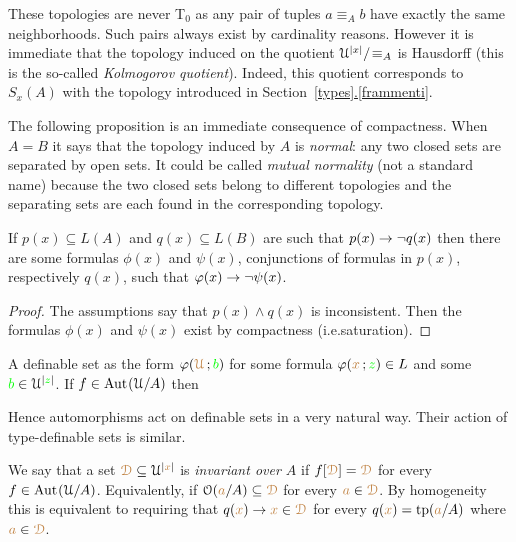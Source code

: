 \documentclass[creche.tex]{subfiles}
\begin{document}
These topologies are never T$_0$ as any pair of tuples $a\equiv_A b$ have exactly the same neighborhoods. Such pairs always exist by cardinality reasons. However it is immediate that the topology induced on the quotient $\EuScript U^{|x|}/\!\equiv_A$ is Hausdorff (this is the so-called \textit{Kolmogorov quotient}). Indeed, this quotient corresponds to $S_x(A)$ with the topology introduced in Section~\hyperref[frammenti]{\ref{types}.\ref*{frammenti}}.

The following proposition is an immediate consequence of compactness. When $A=B$ it says that the topology induced by $A$ is \textit{normal}: any two closed sets are separated by open sets. It could be called \emph{mutual normality\/} (not a standard name) because the two closed sets belong to different topologies and the separating sets are each found in the corresponding topology.

\begin{proposition}\label{prop_normality}
If $p(x)\subseteq L(A)$ and $q(x)\subseteq L(B)$ are such that $p(x)\rightarrow \neg q(x)$ then there are some formulas $\phi(x)$ and $\psi(x)$, conjunctions of formulas in $p(x)$, respectively $q(x)$, such that $\varphi(x)\rightarrow\neg\psi(x)$.
\end{proposition}

\begin{proof}
The assumptions say that $p(x)\wedge q(x)$ is inconsistent. Then the formulas $\phi(x)$ and $\psi(x)$ exist by compactness (i.e.\@ saturation).
\end{proof}

A definable set as the form $\varphi({\color{brown}\EuScript U}\,;{\color{green} b})$ for some formula $\varphi({\color{brown} x}\,;{\color{green} z})\in L$ and some ${\color{green} b}\in\EuScript U^{|{\color{green} z}|}$. If $f\in\textrm{Aut\kern.15ex}(\EuScript U/A)$ then 




Hence automorphisms act on definable sets in a very natural way. Their action of type-definable sets is similar.

We say that a set ${\color{brown}\EuScript D}\subseteq\EuScript U^{|{\color{brown} x}|}$ is \emph{invariant over $A$\/} if $f[{\color{brown}\EuScript D}]={\color{brown}\EuScript D}$ for every $f\in\textrm{Aut\kern.15ex}(\EuScript U/A)$. Equivalently, if $\EuScript O({\color{brown} a}/A)\subseteq {\color{brown}\EuScript D}$ for every ${\color{brown} a}\in {\color{brown}\EuScript D}$. By homogeneity this is equivalent to requiring that $q({\color{brown} x})\rightarrow {\color{brown}x}\in{\color{brown}\EuScript D}$ for every $q({\color{brown} x})={\rm tp}({\color{brown} a}/A)$ where ${\color{brown} a}\in {\color{brown}\EuScript D}$.
\end{document}
